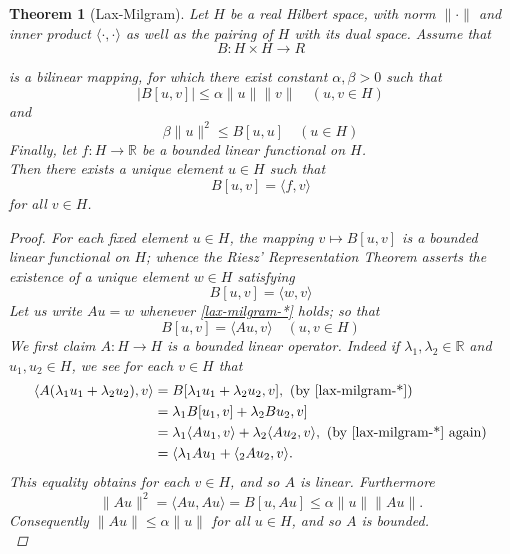 \documentclass[fontsize=14pt,a4paper,DIV=1]{scrartcl}
\newtheorem{theorem}{Theorem}[section]
\numberwithin{equation}{section}
\newcommand{\R}{\mathbb{R}}
\begin{document}
\begin{theorem}[Lax-Milgram]
Let $H$ be a real Hilbert space, with norm $\| \cdot \|$ and inner product $\langle \cdot, \cdot \rangle$ as well as the pairing of $H$ with its dual space. Assume that
	\[ B \colon H \times H \rightarrow R  \]

is a bilinear mapping, for which there exist constant $\alpha, \beta > 0$ such that
	\[ |B[u, v]| \leq \alpha \| u \| \| v \| \quad (u, v \in H) \]
and
	\[ \beta \| u \|^{2} \leq B[u, u] \quad ( u \in H) \]
Finally, let $f \colon H\rightarrow \R$ be a bounded linear functional on $H$. \\

Then there exists a unique element $u \in H$ such that
	\[ B[u, v] = \langle f, v \rangle\]
for all $v \in H$.

\begin{proof} %
	For each fixed element $u \in H$, the mapping $v \mapsto B[u, v]$ is a bounded linear functional on $H$; whence the Riesz' Representation Theorem asserts the existence of a unique element $w \in H$ satisfying
		\begin{equation}
			 B[u, v] = \langle w, v \rangle \label{lax-milgram-*}
		\end{equation}
	Let us write $A u = w$ whenever \eqref{lax-milgram-*} holds; so that
		\[ B[u, v] = \langle Au, v \rangle \quad (u, v \in H) \]
	We first claim $A \colon H \rightarrow H$ is a bounded linear operator. Indeed if $\lambda_{1}, \lambda_{2} \in \R$ and $u_{1}, u_{2} \in H$, we see for each $v \in H$ that
	\begin{align*}
		\langle A (\lambda_{1} u_{1} + \lambda_{2} u_{2}), v \rangle & = B[\lambda_{1} u_{1} + \lambda_{2} u_{2}, v], ~(\text{by \eqref{lax-milgram-*}}) \\
			& = \lambda_{1} B[u_{1}, v] + \lambda_{2} Bu_{2}, v] \\
			& = \lambda_{1} \langle A u_{1}, v \rangle + \lambda_{2} \langle A u_{2}, v \rangle, ~(\text{by \eqref{lax-milgram-*} again}) \\
			& = \langle \lambda_{1} A u_{1} + \langle_{2} A u_{2}, v \rangle.
	\end{align*}
	This equality obtains for each $v \in H$, and so $A$ is linear. Furthermore
	\[ \| A u \|^{2} = \langle A u, A u \rangle = B[u, Au] \leq \alpha \| u \| \| Au \|. \]
	Consequently $\| A u \| \leq \alpha \|u \|$ for all $u \in H$, and so $A$ is bounded. \\
	

\end{proof}
\end{theorem}
\end{document}
